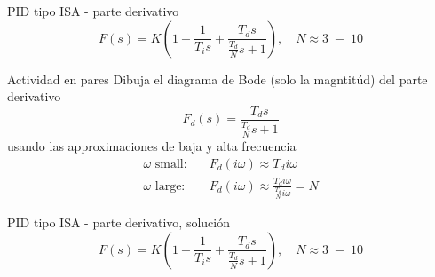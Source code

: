 \documentclass[presentation,aspectratio=1610]{beamer}
\begin{document}
\begin{frame}[label={sec:orgcd570f8}]{PID tipo ISA - parte derivativo}
\[ F(s) = K\left( 1 + \frac{1}{T_i s} + \frac{T_d s}{\frac{T_d}{N} s + 1}\right), \quad N \approx 3\; - \; 10 \]

\alert{Actividad en pares} Dibuja el diagrama de Bode (solo la magntitúd)  del parte derivativo \[F_d(s) = \frac{T_d s}{\frac{T_d}{N} s + 1}\] usando las approximaciones de baja y alta frecuencia
\begin{align*}
 \text{$\omega$ small:} \quad & F_d(i\omega) \approx T_d i\omega \\
 \text{$\omega$ large:} \quad & F_d(i\omega) \approx \frac{T_d i \omega }{\frac{T_d}{N} i\omega} = N
\end{align*}
\end{frame}

\begin{frame}[label={sec:org0caf9bf}]{PID tipo ISA - parte derivativo, solución}
\[ F(s) = K\left( 1 + \frac{1}{T_i s} + \frac{T_d s}{\frac{T_d}{N} s + 1}\right), \quad N \approx 3\; - \; 10 \]

\begin{center}
  \def\Td{1}
  \def\NN{6}
\end{center}
\end{frame}
\end{document}
